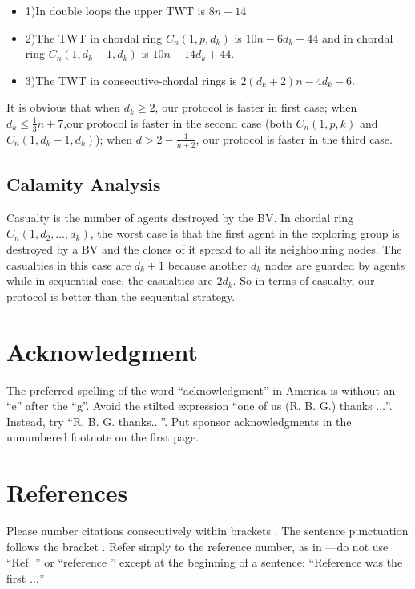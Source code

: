 \documentclass[conference]{IEEEtran}
\begin{document}
\begin{itemize}
\item 1)In double loops the upper TWT is $8n-14$
\item 2)The TWT in chordal ring $C_n(1,p,d_k)$ is $10n-6d_k+44$ and in chordal ring $C_n(1,d_k-1,d_k)$ is $10n-14d_k+44$.
\item 3)The TWT in consecutive-chordal rings is $2(d_k+2)n-4d_k-6$.
\end{itemize}
It is obvious that when $d_k\geq 2$, our protocol is faster in first case; when $d_k\leq \frac{1}{3}n+7$,our protocol is faster in the second case (both $C_n(1,p,k)$ and $C_n(1,d_k-1,d_k)$); when $d>2-\frac{1}{n+2}$, our protocol is faster in the third case.

\subsection{Calamity Analysis}
Casualty is the number of agents destroyed by the BV. In chordal ring $C_n(1, d_2,\dots, d_k)$, the worst case is that the first agent in the exploring group is destroyed by a BV and the clones of it spread to all its neighbouring nodes. The casualties in this case are $d_k+1$ because another $d_k$ nodes are guarded by agents while in sequential case, the casualties are $2d_k$. So in terms of casualty, our protocol is better than the sequential strategy.

\section*{Acknowledgment}

The preferred spelling of the word ``acknowledgment'' in America is without 
an ``e'' after the ``g''. Avoid the stilted expression ``one of us (R. B. 
G.) thanks $\ldots$''. Instead, try ``R. B. G. thanks$\ldots$''. Put sponsor 
acknowledgments in the unnumbered footnote on the first page.

\section*{References}

Please number citations consecutively within brackets \cite{b1}. The 
sentence punctuation follows the bracket \cite{b2}. Refer simply to the reference 
number, as in \cite{b3}---do not use ``Ref. \cite{b3}'' or ``reference \cite{b3}'' except at 
the beginning of a sentence: ``Reference \cite{b3} was the first $\ldots$''
\end{document}
